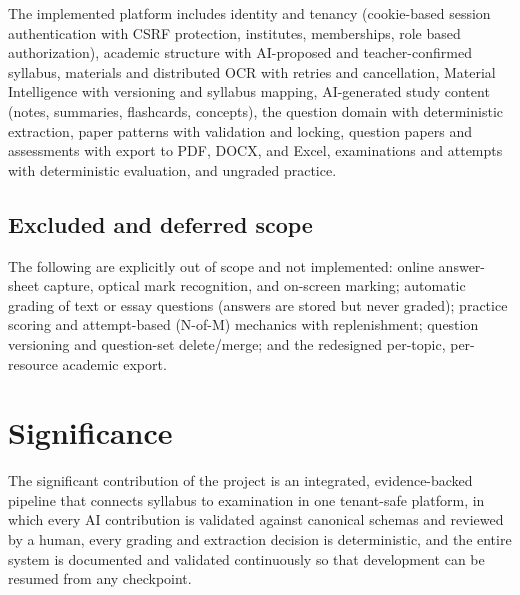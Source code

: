 The implemented platform includes identity and tenancy (cookie-based session
authentication with CSRF protection, institutes, memberships, role based
authorization), academic structure with AI-proposed and teacher-confirmed
syllabus, materials and distributed OCR with retries and cancellation,
Material Intelligence with versioning and syllabus mapping, AI-generated study
content (notes, summaries, flashcards, concepts), the question domain with
deterministic extraction, paper patterns with validation and locking, question
papers and assessments with export to PDF, DOCX, and Excel, examinations and
attempts with deterministic evaluation, and ungraded practice.

\subsection{Excluded and deferred scope}

The following are explicitly out of scope and not implemented: online
answer-sheet capture, optical mark recognition, and on-screen marking;
automatic grading of text or essay questions (answers are stored but never
graded); practice scoring and attempt-based (N-of-M) mechanics with
replenishment; question versioning and question-set delete/merge; and the
redesigned per-topic, per-resource academic export.

\section{Significance}

The significant contribution of the project is an integrated, evidence-backed
pipeline that connects syllabus to examination in one tenant-safe platform, in
which every AI contribution is validated against canonical schemas and
reviewed by a human, every grading and extraction decision is deterministic,
and the entire system is documented and validated continuously so that
development can be resumed from any checkpoint.
